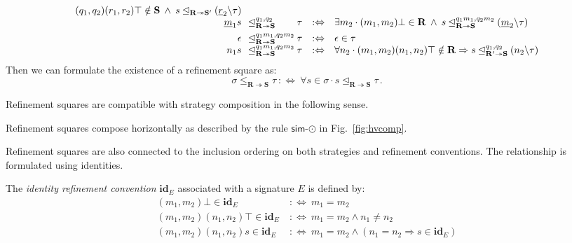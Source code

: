 \documentclass[acmsmall,screen,review,anonymous,nonacm]{acmart}
\newcommand{\kw}[1]{\ensuremath{ \mathsf{#1} }}
\newcommand{\idsc}{\mathbf{id}} %
\begin{document}
\begin{definition}
\[\begin{array}{r@{\:\:\:}l@{\:}l@{\quad:\Leftrightarrow\quad}l}
      (q_1, q_2)(r_1, r_2)\top \notin \mathbf{S} \:\wedge\:
      s \unlhd_{\mathbf{R} \twoheadrightarrow \mathbf{S}'}
      (\underline{r}_2 \backslash \tau )
  \\
  \underline{m}_1 s &
  \unlhd_{\mathbf{R} \twoheadrightarrow \mathbf{S}}^{q_1,q_2} &
  \tau &
    \exists m_2 \cdot
      (m_1, m_2) \bot \in \mathbf{R} \:\wedge\:
      s \unlhd_{\mathbf{R} \twoheadrightarrow \mathbf{S}}^{q_1m_1,q_2m_2}
        (\underline{m}_2 \backslash \tau )
  \\[1ex]
  \epsilon &
  \unlhd_{\mathbf{R} \twoheadrightarrow \mathbf{S}}^{q_1m_1,q_2m_2} &
  \tau &
    \epsilon \in \tau
  \\
  n_1 s &
  \unlhd_{\mathbf{R} \twoheadrightarrow \mathbf{S}}^{q_1m_1,q_2m_2} &
  \tau &
    \forall n_2 \cdot
      (m_1,m_2)(n_1, n_2)\top \notin \mathbf{R} \Rightarrow
      s \unlhd_{\mathbf{R}' \twoheadrightarrow \mathbf{S}}^{q_1,q_2}
        (n_2 \backslash \tau)
\end{array}
\]
Then we can formulate the existence of a refinement square as:
\[
  \sigma \le_{\mathbf{R} \twoheadrightarrow \mathbf{S}} \tau
    \::\Leftrightarrow\:
  \forall s \in \sigma \cdot
    s \unlhd_{\mathbf{R} \twoheadrightarrow \mathbf{S}} \tau
  \,.
\]
\end{definition}

Refinement squares are compatible with strategy composition
in the following sense.

\begin{theorem}%
Refinement squares compose horizontally
as described by the rule $\kw{sim}$-$\odot$
in Fig.~\ref{fig:hvcomp}.
\end{theorem}

Refinement squares are also connected to
the inclusion ordering on both strategies and refinement conventions.
The relationship is formulated using identities.

\begin{definition}
The \emph{identity refinement convention} $\idsc_E$
associated with a signature $E$ is defined by:
\begin{align*}
  (m_1, m_2) \bot \in \idsc_E &\::\Leftrightarrow\:
    m_1 = m_2 \\
  (m_1, m_2) (n_1, n_2) \top \in \idsc_E &\::\Leftrightarrow\:
    m_1 = m_2 \wedge n_1 \neq n_2 \\
  (m_1, m_2) (n_1, n_2) s \in \idsc_E &\::\Leftrightarrow\:
    m_1 = m_2 \wedge (n_1 = n_2 \Rightarrow s \in \idsc_E)
\end{align*}
\end{definition}
\end{document}
